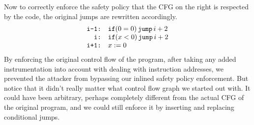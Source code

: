 \documentclass[11pt,twoside]{scrartcl}
\begin{document}
Now to correctly enforce the safety policy that the CFG on the right is respected by the code, the original jumps are rewritten accordingly.
\[
\begin{array}{rl}
\texttt{\upshape i-1:} & \texttt{\upshape if}(0=0)\,\texttt{\upshape jump}\,i+2 \\
\texttt{\upshape i:} & \texttt{\upshape if}(x < 0)\,\texttt{\upshape jump}\,i+2 \\
\texttt{\upshape i+1:} & x := 0
\end{array}
\]
By enforcing the original control flow of the program, after taking any added instrumentation into account with dealing with instruction addresses, we prevented the attacker from bypassing our inlined safety policy enforcement. But notice that it didn't really matter what control flow graph we started out with. It could have been arbitrary, perhaps completely different from the actual CFG of the original program, and we could still enforce it by inserting and replacing conditional jumps.



\end{document}
